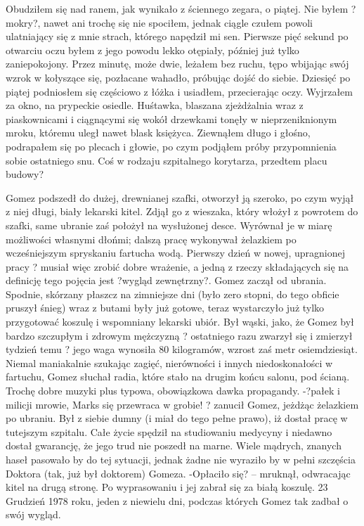 \documentclass[../MAIN.tex]{subfiles}
\begin{document}
Obudziłem się nad ranem, jak wynikało z ściennego zegara, o piątej. Nie byłem ?mokry?, nawet ani trochę się nie spociłem, jednak ciągle czułem powoli ulatniający się z mnie strach, którego napędził mi sen. Pierwsze pięć sekund po otwarciu oczu byłem z jego powodu lekko otępiały, później już tylko zaniepokojony. Przez minutę, może dwie, leżałem bez ruchu, tępo wbijając swój wzrok w kołyszące się, pozłacane wahadło, próbując dojść do siebie.
Dziesięć po piątej podniosłem się częściowo z łóżka i usiadłem, przecierając oczy. Wyjrzałem za okno, na prypeckie osiedle. Huśtawka, blaszana zjeżdżalnia wraz z piaskownicami i ciągnącymi się wokół drzewkami tonęły w nieprzeniknionym mroku, któremu uległ nawet blask księżyca.
Ziewnąłem długo i głośno, podrapałem się po plecach i głowie, po czym podjąłem próby przypomnienia sobie ostatniego snu.
Coś w rodzaju szpitalnego korytarza, przedtem placu budowy?


Gomez podszedł do dużej, drewnianej szafki, otworzył ją szeroko, po czym wyjął z niej długi, biały lekarski kitel. Zdjął go z wieszaka, który włożył z powrotem do szafki, same ubranie zaś położył na wysłużonej desce. Wyrównał je w miarę możliwości własnymi dłońmi; dalszą pracę wykonywał żelazkiem po wcześniejszym spryskaniu fartucha wodą.
Pierwszy dzień w nowej, upragnionej pracy ? musiał więc zrobić dobre wrażenie, a jedną z rzeczy składających się na definicję tego pojęcia jest ?wygląd zewnętrzny?. Gomez zaczął od ubrania. Spodnie, skórzany płaszcz na zimniejsze dni (było zero stopni, do tego obficie pruszył śnieg) wraz z butami były już gotowe, teraz wystarczyło już tylko przygotować koszulę i wspomniany lekarski ubiór.
Był wąski, jako, że Gomez był bardzo szczupłym i zdrowym mężczyzną ? ostatniego razu zwarzył się i zmierzył tydzień temu ? jego waga wynosiła 80 kilogramów, wzrost zaś metr osiemdziesiąt.
Niemal maniakalnie szukając zagięć, nierówności i innych niedoskonałości w fartuchu, Gomez słuchał radia, które stało na drugim końcu salonu, pod ścianą. Trochę dobre muzyki plus typowa, obowiązkowa dawka propagandy.
-?pałek i milicji mrowie, Marks się przewraca w grobie! ? zanucił Gomez, jeżdżąc żelazkiem po ubraniu. Był z siebie dumny (i miał do tego pełne prawo), iż dostał pracę w tutejszym szpitalu. Całe życie spędził na studiowaniu medycyny i niedawno dostał gwarancję, że jego trud nie poszedł na marne.
Wiele mądrych, znanych haseł pasowało by do tej sytuacji, jednak żadne nie wyraziło by w pełni szczęścia Doktora (tak, już był doktorem) Gomeza.
-Opłaciło się? -- mruknął, odwracając kitel na drugą stronę. Po wyprasowaniu i jej zabrał się za białą koszulę.
23 Grudzień 1978 roku, jeden z niewielu dni, podczas których Gomez tak zadbał o swój wygląd.
\end{document}
